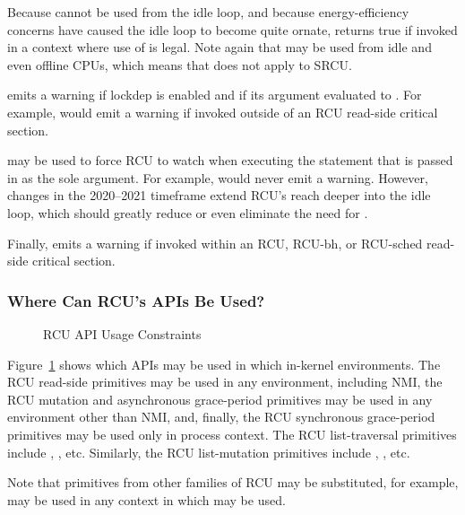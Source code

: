 Because  cannot be used from the idle loop,
and because energy-efficiency concerns have caused the idle loop
to become quite ornate,  returns true if
invoked in a context where use of  is legal.
Note again that  may be used from idle and
even offline CPUs, which means that  does not
apply to SRCU.

 emits a warning if lockdep is enabled and if
its argument evaluated to .
For example,  would emit a
warning if invoked outside of an RCU read-side critical section.

 may be used to force RCU to watch when executing
the statement that is passed in as the sole argument.
For example, 
would never emit a warning.
However, changes in the 2020--2021 timeframe extend RCU's reach deeper
into the idle loop, which should greatly reduce or even eliminate the
need for .

Finally,   emits a warning if invoked within
an RCU, RCU-bh, or RCU-sched read-side critical section.

\subsubsection{Where Can RCU's APIs Be Used?}
\label{sec:defer:Where Can RCU's APIs Be Used?}

\begin{figure}[tb]
\centering
{}
\caption{RCU API Usage Constraints}
\label{fig:defer:RCU API Usage Constraints}
\end{figure}

Figure~\ref{fig:defer:RCU API Usage Constraints}
shows which APIs may be used in which in-kernel environments.
The RCU read-side primitives may be used in any environment, including NMI,
the RCU mutation and asynchronous grace-period primitives may be used in any
environment other than NMI, and, finally, the RCU synchronous grace-period
primitives may be used only in process context.
The RCU list-traversal primitives include ,
, etc.
Similarly, the RCU list-mutation primitives include
, , etc.

Note that primitives from other families of RCU may be substituted,
for example,  may be used in any context
in which  may be used.

